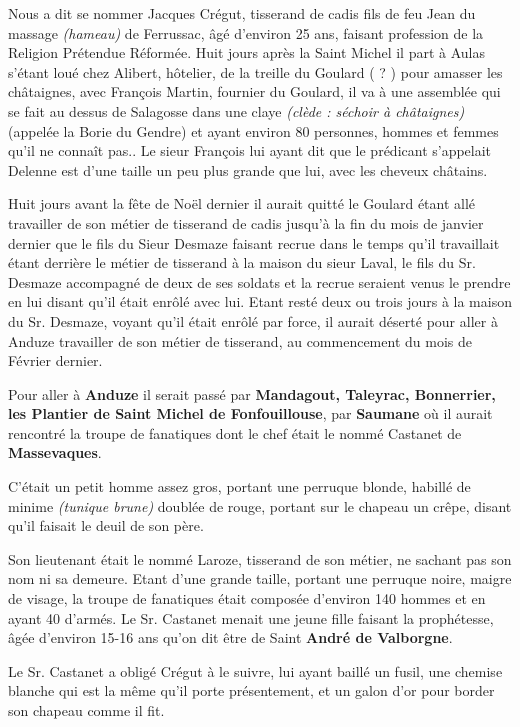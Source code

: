 Nous a dit se nommer Jacques Crégut, tisserand de cadis fils de feu Jean du massage \textit{(hameau)} de Ferrussac, âgé d’environ 25 ans, faisant profession de la Religion Prétendue Réformée. Huit jours après la Saint Michel il part à Aulas s’étant loué chez Alibert, hôtelier, de la treille du Goulard ( ? ) pour amasser les châtaignes, avec François Martin, fournier du Goulard, il va à une assemblée qui se fait au dessus de Salagosse dans une claye \textit{(clède : séchoir à châtaignes)} (appelée la Borie du Gendre) et ayant environ 80 personnes, hommes et femmes qu’il ne connaît pas.. Le sieur François lui ayant dit que le prédicant s’appelait Delenne est d’une taille un peu plus grande que lui, avec les cheveux châtains.

Huit jours avant la fête de Noël dernier il aurait quitté le Goulard étant allé travailler de son métier de tisserand de cadis jusqu’à la fin du mois de janvier dernier que le fils du Sieur Desmaze faisant recrue dans le temps qu’il travaillait étant derrière le métier de tisserand à la maison du sieur Laval, le fils du Sr. Desmaze accompagné de deux de ses soldats et la recrue seraient venus le prendre en lui disant qu’il était enrôlé avec lui. Etant resté deux ou trois jours à la maison du Sr. Desmaze, voyant qu’il était enrôlé par force, il aurait déserté pour aller à Anduze travailler de son métier de tisserand, au commencement du mois de Février dernier.

Pour aller à \textbf{Anduze} il serait passé par \textbf{Mandagout, Taleyrac, Bonnerrier, les Plantier de Saint Michel de Fonfouillouse}, par \textbf{Saumane} où il aurait rencontré la troupe de fanatiques dont le chef était le nommé Castanet de \textbf{Massevaques}.

C’était un petit homme assez gros, portant une perruque blonde, habillé de minime \textit{(tunique brune)} doublée de rouge, portant sur le chapeau un crêpe, disant qu’il faisait le deuil de son père.

Son lieutenant était le nommé Laroze, tisserand de son métier, ne sachant pas son nom ni sa demeure. Etant d’une grande taille, portant une perruque noire, maigre de visage, la troupe de fanatiques était composée d’environ 140 hommes et en ayant 40 d’armés. Le Sr. Castanet menait une jeune fille faisant la prophétesse, âgée d’environ 15-16 ans qu’on dit être de Saint \textbf{André de Valborgne}.

Le Sr. Castanet a obligé Crégut à le suivre, lui ayant baillé un fusil, une chemise blanche qui est la même qu’il porte présentement, et un galon d’or pour border son chapeau comme il fit.

